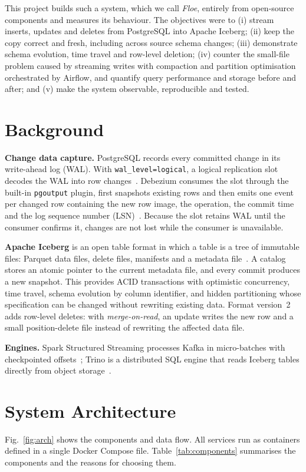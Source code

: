 \documentclass[conference,a4paper]{IEEEtran}
\newcommand{\code}[1]{\texttt{#1}}
\begin{document}
This project builds such a system, which we call \emph{Floe}, entirely from open-source components and measures its
behaviour. The objectives were to (i) stream inserts, updates and deletes from PostgreSQL into Apache Iceberg;
(ii) keep the copy correct and fresh, including across source schema changes; (iii) demonstrate schema evolution,
time travel and row-level deletion; (iv) counter the small-file problem caused by streaming writes with compaction
and partition optimisation orchestrated by Airflow, and quantify query performance and storage before and after; and
(v) make the system observable, reproducible and tested.

\section{Background}
\textbf{Change data capture.} PostgreSQL records every committed change in its write-ahead log (WAL). With
\code{wal\_level=logical}, a logical replication slot decodes the WAL into row changes~\cite{pglogical}. Debezium
consumes the slot through the built-in \code{pgoutput} plugin, first snapshots existing rows and then emits one event
per changed row containing the new row image, the operation, the commit time and the log sequence number
(LSN)~\cite{debezium}. Because the slot retains WAL until the consumer confirms it, changes are not lost while the
consumer is unavailable.

\textbf{Apache Iceberg} is an open table format in which a table is a tree of immutable files: Parquet data files,
delete files, manifests and a metadata file~\cite{iceberg}. A catalog stores an atomic pointer to the current
metadata file, and every commit produces a new snapshot. This provides ACID transactions with optimistic
concurrency, time travel, schema evolution by column identifier, and hidden partitioning whose specification can be
changed without rewriting existing data. Format version~2 adds row-level deletes: with \emph{merge-on-read}, an update
writes the new row and a small position-delete file instead of rewriting the affected data file.

\textbf{Engines.} Spark Structured Streaming processes Kafka in micro-batches with checkpointed
offsets~\cite{spark}; Trino is a distributed SQL engine that reads Iceberg tables directly from object
storage~\cite{trino}.

\section{System Architecture}
Fig.~\ref{fig:arch} shows the components and data flow. All services run as containers defined in a single
Docker Compose file. Table~\ref{tab:components} summarises the components and the reasons for choosing them.
\end{document}
